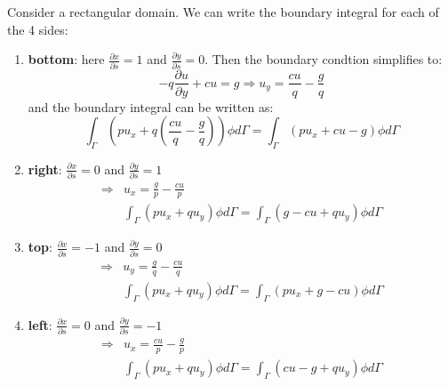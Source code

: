 \documentclass[a4paper]{article}
\begin{document}
Consider a rectangular domain. We can write the boundary integral for each of the 4 sides:
\begin{enumerate}
	\item \textbf{bottom}: here $\frac{\partial x}{\partial s} = 1$ and $\frac{\partial y}{\partial s} = 0$. Then the boundary condtion simplifies to:
	\[ -q\frac{\partial u}{\partial y} + cu  = g \Rightarrow u_y = \frac{c u}{q} - \frac{g}{q}\]
	and the boundary integral can be written as:
	\[\int_\Gamma \left(p u_x + q \left(\frac{c u}{q} - \frac{g}{q}\right)\right)\phi d\Gamma = \int_\Gamma \left(p u_x + cu - g \right)\phi d\Gamma\]
	
	\item \textbf{right}: $\frac{\partial x}{\partial s}=0$ and $\frac{\partial y}{\partial s} = 1$
	\begin{align*}
		\Rightarrow & u_x =  \frac{g}{p} -\frac{c u}{p} \\
					&\int_\Gamma \left(p u_x + q u_y\right)\phi d\Gamma = \int_\Gamma \left(g - cu + q u_y\right)\phi d\Gamma
	\end{align*}
	
	\item \textbf{top}: $\frac{\partial x}{\partial s}=-1$ and $\frac{\partial y}{\partial s} = 0$
	\begin{align*}
		\Rightarrow & u_y = \frac{g}{q} - \frac{c u}{q} \\
					&\int_\Gamma \left(p u_x + q u_y\right)\phi d\Gamma = \int_\Gamma \left( p u_x + g - cu\right)\phi d\Gamma
	\end{align*}
	
	\item \textbf{left}: $\frac{\partial x}{\partial s}=0$ and $\frac{\partial y}{\partial s} = -1$
	\begin{align*}
		\Rightarrow & u_x =  \frac{c u}{p} - \frac{g}{p} \\
					&\int_\Gamma \left(p u_x + q u_y\right)\phi d\Gamma = \int_\Gamma \left( cu - g + q u_y\right)\phi d\Gamma
	\end{align*}
\end{enumerate}
\end{document}
